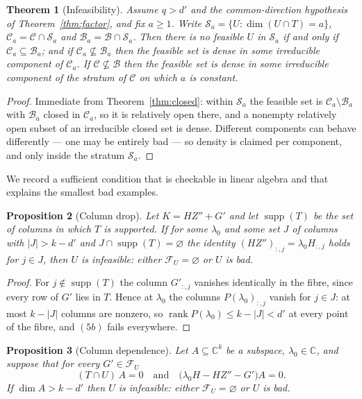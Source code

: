 \documentclass[journal]{IEEEtran}
\theoremstyle{plainn}
\newtheorem{thm}{Theorem}
\newtheorem{prop}[thm]{Proposition}
\theoremstyle{remark}
\begin{document}
\begin{thm}[Infeasibility]\label{thm:no}
Assume $q>d'$ and the common-direction hypothesis of Theorem~\ref{thm:factor}, and fix
$a\ge1$. Write $\mathcal S_a=\{U:\dim(U\cap T)=a\}$, $\mathcal C_a=\mathcal C\cap\mathcal S_a$ and
$\mathcal B_a=\mathcal B\cap\mathcal S_a$. Then there is no feasible $U$ in $\mathcal S_a$ if and only if
$\mathcal C_a\subseteq\mathcal B_a$; and if $\mathcal C_a\not\subseteq\mathcal B_a$ then the feasible set is
dense in some irreducible component of $\mathcal C_a$. If
$\mathcal C\not\subseteq\mathcal B$ then the feasible set is dense in some irreducible component of the stratum of $\mathcal C$ on which $a$ is
constant.
\end{thm}

\begin{proof}
Immediate from Theorem~\ref{thm:closed}: within $\mathcal S_a$ the feasible set is
$\mathcal C_a\setminus\mathcal B_a$ with $\mathcal B_a$ closed in $\mathcal C_a$, so it is relatively
open there, and a nonempty relatively open subset of an irreducible closed set is dense. Different
components can behave differently --- one may be entirely bad --- so density is claimed per component,
and only inside the stratum $\mathcal S_a$.
\end{proof}

We record a sufficient condition that is checkable in linear algebra and that explains the smallest
bad examples.

\begin{prop}[Column drop]\label{prop:drop}
Let $K=HZ''+G'$ and let $\operatorname{supp}(T)$ be the set of columns in which $T$ is supported. If
for some $\lambda_0$ and some set $J$ of columns with $|J|>k-d'$ and $J\cap\operatorname{supp}(T)=\varnothing$
the identity $(HZ'')_{:,j}=\lambda_0H_{:,j}$ holds for $j\in J$, then $U$ is infeasible: either
$\mathcal F_U=\varnothing$ or $U$ is bad.
\end{prop}

\begin{proof}
For $j\notin\operatorname{supp}(T)$ the column $G'_{:,j}$ vanishes identically in the fibre, since
every row of $G'$ lies in $T$. Hence at $\lambda_0$ the columns $P(\lambda_0)_{:,j}$ vanish for
$j\in J$: at most $k-|J|$ columns are nonzero, so $\operatorname{rank}P(\lambda_0)\le k-|J|<d'$ at
every point of the fibre, and $(5b)$ fails everywhere.
\end{proof}

\begin{prop}[Column dependence]\label{prop:dependence}
Let $A\subseteq\mathbb C^{k}$ be a subspace, $\lambda_0\in\mathbb C$, and suppose that for every
$G'\in\mathcal F_U$
$$(T\cap U)\,A=0\quad\text{and}\quad\bigl(\lambda_0H-HZ''-G'\bigr)A=0 .$$
If $\dim A>k-d'$ then $U$ is infeasible: either $\mathcal F_U=\varnothing$ or $U$ is bad.
\end{prop}
\end{document}
